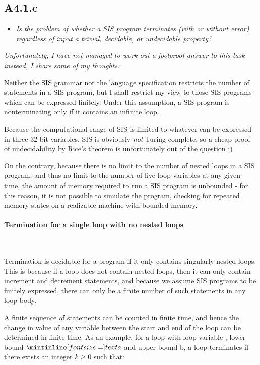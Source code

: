 
\newpage
\subsection{A4.1.c}
%
\begin{itemize}
  \item \emph{Is the problem of whether a SIS program terminates (with or
    without error) regardless of input a trivial, decidable, or undecidable
    property?}
\end{itemize}

\emph{Unfortunately, I have not managed to work out a foolproof answer to this
task - instead, I share some of my thoughts.}

\bigskip

Neither the SIS grammar nor the language specification restricts the
number of statements in a SIS program, but I shall restrict my view to those SIS
programs which can be expressed finitely. Under this assumption, a SIS program
is nonterminating only if it contains an infinite loop.

\medskip

Because the computational range of SIS is limited to whatever can be expressed
in three 32-bit variables, SIS is obviously \emph{not} Turing-complete, so a
cheap proof of undecidability by Rice's theorem is unfortunately out of the
question ;)

\smallskip

On the contrary, because there is no limit to the number of nested loops in a
SIS program, and thus no limit to the number of live loop variables at any given
time, the amount of memory required to run a SIS program is unbounded - for this
reason, it is not possible to simulate the program, checking for repeated memory
states on a realizable machine with bounded memory.

\paragraph{Termination for a single loop with no nested loops}~\smallskip

Termination is decidable for a program if it only contains singularly nested
loops. This is because if a loop does not contain nested loops, then it can only
contain increment and decrement statements, and because we assume SIS programs
to be finitely expressed, there can only be a finite number of such statements
in any loop body. 

\medskip

A finite sequence of statements can be counted in finite time, and hence the
change in value of any variable between the start and end of the loop can be
determined in finite time. As an example, for a loop with loop variable ,
lower bound $\ms a$ and upper bound \ms b, a loop terminates if there exists an
integer $k \geq 0$ such that:


